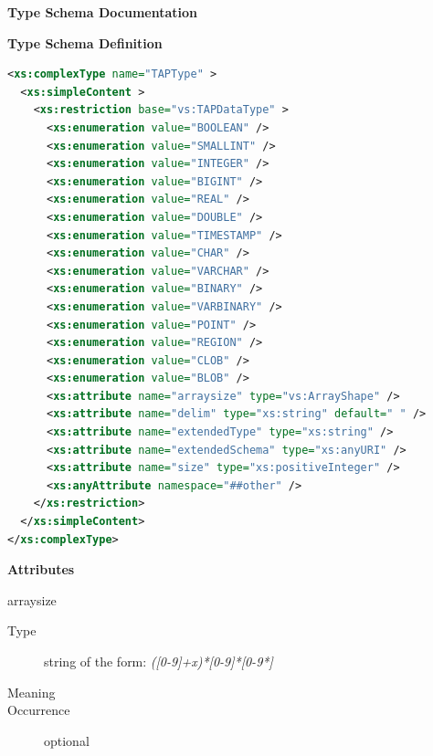 \documentclass[11pt,a4paper]{ivoa}
\begin{document}
\begin{generated}
\begingroup
      	\renewcommand*\descriptionlabel[1]{%
      	\hbox to 5.5em{\emph{#1}\hfil}}\vspace{2ex}\noindent\textbf{ Type Schema Documentation}


\vspace{1ex}\noindent\textbf{ Type Schema Definition}

\begin{lstlisting}[language=XML,basicstyle=\footnotesize]
<xs:complexType name="TAPType" >
  <xs:simpleContent >
    <xs:restriction base="vs:TAPDataType" >
      <xs:enumeration value="BOOLEAN" />
      <xs:enumeration value="SMALLINT" />
      <xs:enumeration value="INTEGER" />
      <xs:enumeration value="BIGINT" />
      <xs:enumeration value="REAL" />
      <xs:enumeration value="DOUBLE" />
      <xs:enumeration value="TIMESTAMP" />
      <xs:enumeration value="CHAR" />
      <xs:enumeration value="VARCHAR" />
      <xs:enumeration value="BINARY" />
      <xs:enumeration value="VARBINARY" />
      <xs:enumeration value="POINT" />
      <xs:enumeration value="REGION" />
      <xs:enumeration value="CLOB" />
      <xs:enumeration value="BLOB" />
      <xs:attribute name="arraysize" type="vs:ArrayShape" />
      <xs:attribute name="delim" type="xs:string" default=" " />
      <xs:attribute name="extendedType" type="xs:string" />
      <xs:attribute name="extendedSchema" type="xs:anyURI" />
      <xs:attribute name="size" type="xs:positiveInteger" />
      <xs:anyAttribute namespace="##other" />
    </xs:restriction>
  </xs:simpleContent>
</xs:complexType>
\end{lstlisting}

\vspace{0.5ex}\noindent\textbf{ Attributes}

\begingroup\small\begin{bigdescription}
\item[arraysize]
\begin{description}
\item[Type] string of the form: \emph{([0-9]+x)*[0-9]*[0-9*]}
\item[Meaning] 
\item[Occurrence] optional


\end{description}
\end{bigdescription}
\end{generated}
\end{document}
